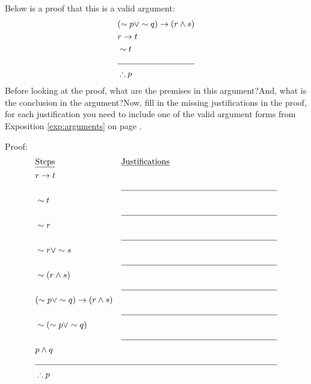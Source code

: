 \clearpage

\begin{practiceprob} Below is a proof that this is a valid argument:
    \begin{align}
        &(\sim p\vee \sim q) \rightarrow (r\wedge s)\\
        &r\rightarrow t\\
        & \sim t\\\cline{1-2}
        &\therefore p
    \end{align}
    Before looking at the proof, what are the premises in this argument?\vspace{4\baselineskip}\newline And, what is the conclusion in the argument?\vspace{4\baselineskip}\newline Now, fill in the missing justifications in the proof, for each justification you need to include one of the valid argument forms from Exposition \ref{exp:arguments} on page \pageref{exp:arguments}.

    \noindent
    Proof:
    \begin{align}
        &\text{\underline{Steps}} &&\text{\underline{Justifications}}\nonumber \\
        & r \rightarrow t && \phantom{Step (??) and Step (??) and Some Logical Law}\\ \cline{3-4}
        & \sim t && \\ \cline{3-4}
        & \sim r &&\\ \cline{3-4}
        & \sim r \vee \sim s &&\\ \cline{3-4}
        & \sim(r\wedge s) &&\\ \cline{3-4}
        &(\sim p\vee \sim q) \rightarrow (r\wedge s)&&\\ \cline{3-4}
        &\sim(\sim p \vee \sim q)&&\\ \cline{3-4}
        & p\wedge q &&\\ \cline{1-4} 
        &\therefore p
    \end{align}    
\end{practiceprob}

\clearpage

